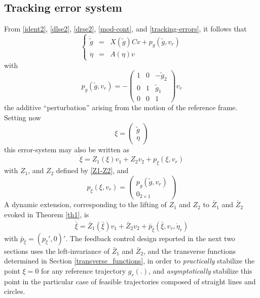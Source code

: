 \documentclass[a4paper,twoside]{article}
\begin{document}
\subsection{Tracking error system}
From  \eqref{ident2}, \eqref{dlse2}, \eqref{drse2},  \eqref{mod-cont}, and \eqref{tracking-errors}, it follows that 
\begin{equation} 
\label{error-system}
\left \{
\begin{array}{lcl}
\dot{\tilde{g}} & = & X(\tilde g) C v +p_g(\tilde{g},v_r)\\
\dot{\eta} & = & A(\eta) v 
\end{array}
\right.
\end{equation}
with \[
p_g(\tilde{g},v_r)= -\begin{pmatrix}
1 & 0 & -\tilde{g}_2 \\
0 & 1 & \tilde{g}_1 \\
0 & 0 & 1 
\end{pmatrix} v_r
\]
the additive ``perturbation'' arising from the motion of the reference frame. 
Setting now
\[
\xi=\begin{pmatrix}
\tilde{g}\\
\eta
\end{pmatrix}
\]
this error-system may also be written as
\begin{equation} \label{error-systembis}
\dot{\xi}=Z_1(\xi)v_1+Z_2v_2+p_{\xi}(\xi,v_r)
\end{equation}
with $Z_1$, and $Z_2$ defined by \eqref{Z1-Z2}, and
\begin{equation} \label{pxi}
p_{\xi}(\xi,v_r)=\begin{pmatrix} p_g(\tilde{g},v_r) \\ 0_{2 \times 1} \end{pmatrix}
\end{equation}
A dynamic extension, corresponding to the lifting of $Z_1$ and $Z_2$ to $\bar Z_1$ and $\bar Z_2$ evoked in Theorem \ref{th1}, is
\begin{equation} \label{mod-contex-err}
\dot{\bar{\xi}}=\bar Z_1(\bar{\xi}) v_1+ \bar Z_2 v_2 +\bar{p}_{\bar{\xi}}(\bar{\xi},v_r,\dot{\eta}_r)
\end{equation}
with $\bar{p}_{\bar{\xi}}=(p_{\xi}',0)'$. The feedback control design reported in the next two sections uses the left-invariance of $\bar Z_1$ and $\bar Z_2$, and the transverse functions determined in Section \ref{transverse_functions}, in order to {\em practically} stabilize the point $\xi=0$ for any reference trajectory $g_r(.)$, and {\em asymptotically} stabilize this point in the particular case of feasible trajectories composed of straight lines and circles.
 
\end{document}

